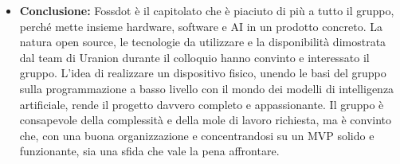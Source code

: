 \documentclass[12pt,a4paper]{article}
\begin{document}
\begin{itemize}
\begin{itemize}
  \item \emph{Contro:} Dall'altra parte, come aspetti negativi il gruppo individua soprattutto la complessità e la mole di lavoro complessiva. Il progetto è indubbiamente impegnativo perché tocca ambiti molto diversi tra loro contemporaneamente: dalla parte hardware e firmware alla pipeline con l'IA, fino al server e all'interfaccia web. Essendo un lavoro così ampio, la difficoltà principale starà proprio nel riuscire a gestire bene i tempi e a non oltrepassare il tempo utile alla consegna del prodotto finale. 
  \end{itemize}
\item \textbf{Conclusione:} Fossdot è il capitolato che è piaciuto di più a tutto il gruppo, perché mette insieme hardware, software e AI in un prodotto concreto. La natura open source, le tecnologie da utilizzare e la disponibilità dimostrata dal team di Uranion durante il colloquio hanno convinto e interessato il gruppo. L'idea di realizzare un dispositivo fisico, unendo le basi del gruppo sulla programmazione a basso livello con il mondo dei modelli di intelligenza artificiale, rende il progetto davvero completo e appassionante. Il gruppo è consapevole della complessità e della mole di lavoro richiesta, ma è convinto che, con una buona organizzazione e concentrandosi su un MVP solido e funzionante, sia una sfida che vale la pena affrontare.
\end{itemize}
\end{document}
